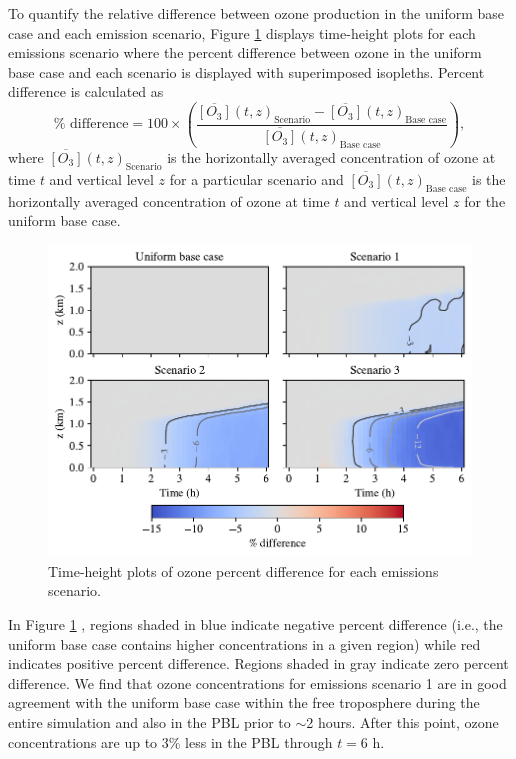 To quantify the relative difference between ozone production in the uniform base case and each emission scenario, Figure \ref{fig:ht-pdiff-o3} displays time-height plots for each emissions scenario where the percent difference between ozone in the uniform base case and each scenario is displayed with superimposed isopleths. Percent difference is calculated as 
\begin{equation}
    \% \text{ difference} = 100\times\left(\frac{\overline{[O_3]}(t, z)_{\text{Scenario}} - \overline{[O_3]}(t, z)_{\text{Base case}}}{\overline{[O_3]}(t, z)_{\text{Base case}}}\right),
\end{equation}
where $\overline{[O_3]}(t, z)_{\text{Scenario}}$ is the horizontally averaged concentration of ozone at time $t$ and vertical level $z$ for a particular scenario and $\overline{[O_3]}(t, z)_{\text{Base case}}$ is the horizontally averaged concentration of ozone at time $t$ and vertical level $z$ for the uniform base case.

\begin{figure}[h]
  \centering
    \includegraphics[width=\textwidth]{figures/chapter4/height-time-o3-pdiff-four-scenarios.pdf}
    \caption{Time-height plots of ozone percent difference for each emissions scenario.}
    \label{fig:ht-pdiff-o3}
\end{figure}

In Figure \ref{fig:ht-pdiff-o3} , regions shaded in blue indicate negative percent difference (i.e., the uniform base case contains higher concentrations in a given region) while red indicates positive percent difference. Regions shaded in gray indicate zero percent difference. We find that ozone concentrations for emissions scenario 1 are in good agreement with the uniform base case within the free troposphere during the entire simulation and also in the PBL prior to $\sim$2 hours. After this point, ozone concentrations are up to 3\% less in the PBL through $t=6$ h.

